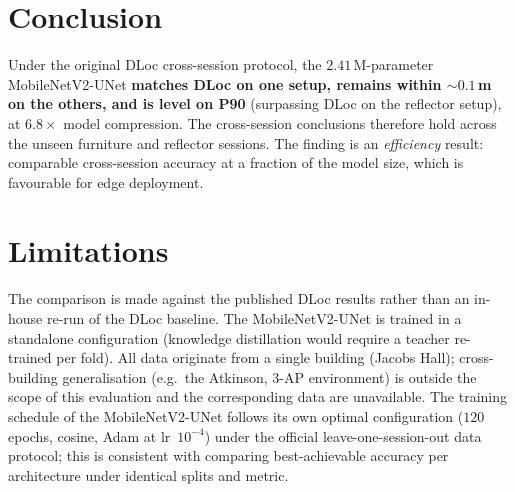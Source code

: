 \documentclass[11pt,a4paper]{article}
\begin{document}
\section{Conclusion}

Under the original DLoc cross-session protocol, the $2.41$\,M-parameter MobileNetV2-UNet
\textbf{matches DLoc on one setup, remains within ${\sim}0.1$\,m on the others, and is level on
P90} (surpassing DLoc on the reflector setup), at $\mathbf{6.8\times}$ model compression. The
cross-session conclusions therefore hold across the unseen furniture and reflector sessions. The
finding is an \emph{efficiency} result: comparable cross-session accuracy at a fraction of the
model size, which is favourable for edge deployment.

\section{Limitations}

The comparison is made against the published DLoc results rather than an in-house re-run of the
DLoc baseline. The MobileNetV2-UNet is trained in a standalone configuration (knowledge
distillation would require a teacher re-trained per fold). All data originate from a single
building (Jacobs Hall); cross-building generalisation (e.g.\ the Atkinson, 3-AP environment) is
outside the scope of this evaluation and the corresponding data are unavailable. The training
schedule of the MobileNetV2-UNet follows its own optimal configuration ($120$ epochs, cosine,
Adam at lr~$10^{-4}$) under the official leave-one-session-out data protocol; this is consistent
with comparing best-achievable accuracy per architecture under identical splits and metric.
\end{document}
